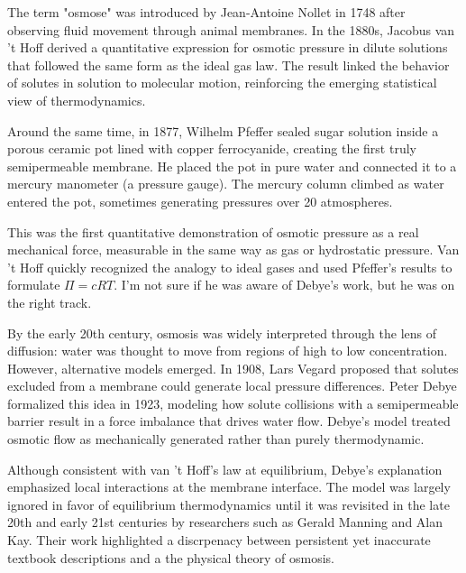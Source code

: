 \begin{historical}
The term "osmose" was introduced by Jean-Antoine Nollet in 1748 after observing fluid movement through animal membranes. In the 1880s, Jacobus van 't Hoff derived a quantitative expression for osmotic pressure in dilute solutions that followed the same form as the ideal gas law. The result linked the behavior of solutes in solution to molecular motion, reinforcing the emerging statistical view of thermodynamics.

Around the same time, in 1877, Wilhelm Pfeffer sealed sugar solution inside a porous ceramic pot lined with copper ferrocyanide, creating the first truly semipermeable membrane. He placed the pot in pure water and connected it to a mercury manometer (a pressure gauge). The mercury column climbed as water entered the pot, sometimes generating pressures over 20 atmospheres.

This was the first quantitative demonstration of osmotic pressure as a real mechanical force, measurable in the same way as gas or hydrostatic pressure. Van 't Hoff quickly recognized the analogy to ideal gases and used Pfeffer's results to formulate $\Pi = cRT$. I'm not sure if he was aware of Debye's work, but he was on the right track.

By the early 20th century, osmosis was widely interpreted through the lens of diffusion: water was thought to move from regions of high to low concentration. However, alternative models emerged. In 1908, Lars Vegard proposed that solutes excluded from a membrane could generate local pressure differences. Peter Debye formalized this idea in 1923, modeling how solute collisions with a semipermeable barrier result in a force imbalance that drives water flow. Debye's model treated osmotic flow as mechanically generated rather than purely thermodynamic.

Although consistent with van ’t Hoff’s law at equilibrium, Debye’s explanation emphasized local interactions at the membrane interface. The model was largely ignored in favor of equilibrium thermodynamics until it was revisited in the late 20th and early 21st centuries by researchers such as Gerald Manning and Alan Kay. Their work highlighted a discrpenacy between persistent yet inaccurate textbook descriptions and a the physical theory of osmosis.
\end{historical}
